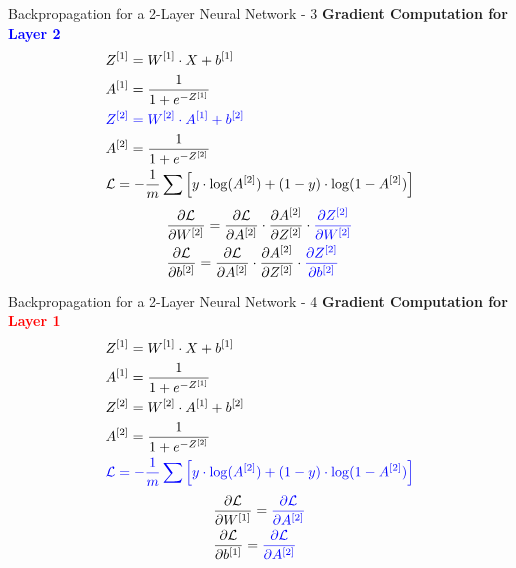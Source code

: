 \documentclass[aspectratio=169]{beamer}
\begin{document}
%
\begin{frame}{Backpropagation for a 2-Layer Neural Network - 3}
\textbf{Gradient Computation for \textcolor{blue}{Layer 2}}
\begin{align*}
&Z^{[1]} = W^{[1]} \cdot X + b^{[1]}\\
&A^{[1]} = \frac{1}{1 + e^{-Z^{[1]}}}      \\
&\textcolor{blue}{Z^{[2]} = W^{[2]} \cdot A^{[1]} + b^{[2]}} \\
&A^{[2]} = \frac{1}{1 + e^{-Z^{[2]}}} \\
&\mathcal{L} = -\frac{1}{m} \sum \left[ y \cdot \log(A^{[2]}) + (1 - y) \cdot \log(1 - A^{[2]}) \right]
\end{align*}
\begin{align*}
&\frac{\partial \mathcal{L}}{\partial W^{[2]}} = \frac{\partial \mathcal{L}}{\partial A^{[2]}} \cdot \frac{\partial A^{[2]}}{\partial Z^{[2]}} \cdot \textcolor{blue}{\frac{\partial Z^{[2]}}{\partial W^{[2]}}}
\\
&\frac{\partial \mathcal{L}}{\partial b^{[2]}} = \frac{\partial \mathcal{L}}{\partial A^{[2]}} \cdot \frac{\partial A^{[2]}}{\partial Z^{[2]}} \cdot \textcolor{blue}{\frac{\partial Z^{[2]}}{\partial b^{[2]}}}
\end{align*}
\end{frame}
%
%
\begin{frame}{Backpropagation for a 2-Layer Neural Network - 4}
\textbf{Gradient Computation for \textcolor{red}{Layer 1}}
\begin{align*}
&Z^{[1]} = W^{[1]} \cdot X + b^{[1]}\\
&A^{[1]} = \frac{1}{1 + e^{-Z^{[1]}}}      \\
&Z^{[2]} = W^{[2]} \cdot A^{[1]} + b^{[2]} \\
&A^{[2]} = \frac{1}{1 + e^{-Z^{[2]}}} \\
&\textcolor{blue}{\mathcal{L} = -\frac{1}{m} \sum \left[ y \cdot \log(A^{[2]}) + (1 - y) \cdot \log(1 - A^{[2]}) \right]}
\end{align*}
\begin{align*}
&\frac{\partial \mathcal{L}}{\partial W^{[1]}} = \textcolor{blue}{\frac{\partial \mathcal{L}}{\partial A^{[2]}}}
\\
&\frac{\partial \mathcal{L}}{\partial b^{[1]}} = \textcolor{blue}{\frac{\partial \mathcal{L}}{\partial A^{[2]}}}  
\end{align*}
\end{frame}
%
\end{document}
